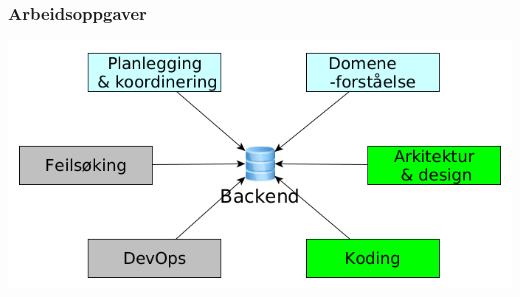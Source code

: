 \documentclass{beamer}
\begin{document}


    \begin{frame}
        \frametitle{Arbeidsoppgaver}
        \includegraphics[width=\textwidth]{images/backend-work}

    \end{frame}
\end{document}
